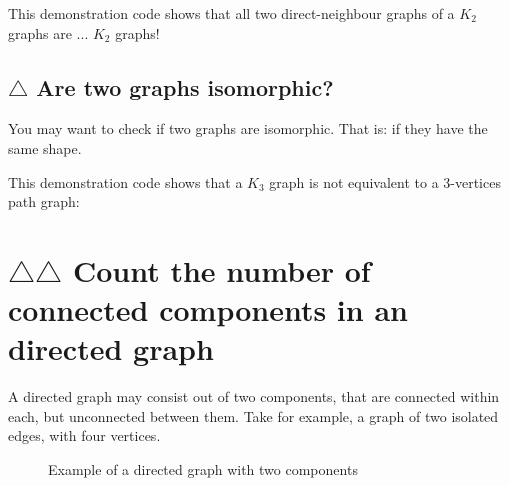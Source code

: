This demonstration code shows that all two direct-neighbour graphs 
of a $K_{2}$ graphs are ... $K_{2}$ graphs!



\subsection{$\triangle$ Are two graphs isomorphic?}
\label{subsec:is_isomorphic}

You may want to check if two graphs are isomorphic.
 That is: if they have the same shape.



This demonstration code shows that a 
$K_{3}$ graph is not equivalent to a 3-vertices path graph:



\section{$\triangle$$\triangle$ Count the number of connected components in an directed graph}
\label{subsec:count_directed_graph_connected_components}

A directed graph may consist out of two components, that are connected within
each, but unconnected between them.
Take for example, a graph of two isolated edges, with four vertices.

\begin{figure}
  \caption{Example of a directed graph with two components}
  \label{fig:count_directed_graph_connected_components}
\end{figure}

